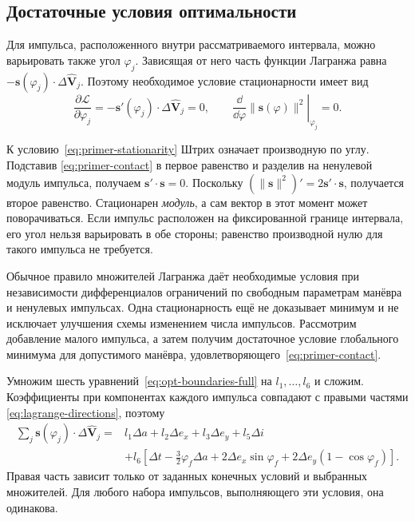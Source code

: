 \subsection{Достаточные условия оптимальности}
\label{sec:optimality-check-full}

Для импульса, расположенного внутри рассматриваемого интервала,
можно варьировать также угол $\varphi_j$. Зависящая от него часть
функции Лагранжа равна
$-\boldsymbol s(\varphi_j)\cdot\Delta\widehat{\boldsymbol V}_j$.
Поэтому необходимое условие стационарности имеет вид
\begin{equation}
 \frac{\partial\mathcal L}{\partial\varphi_j}
 =-\boldsymbol s'(\varphi_j)\cdot\Delta\widehat{\boldsymbol V}_j=0,
 \qquad
 \left.\frac{\dd}{\dd\varphi}\|\boldsymbol s(\varphi)\|^2
                  \right|_{\varphi_j}=0.
 \label{eq:primer-stationarity}
\end{equation}
\begin{explanation}{К условию~\eqref{eq:primer-stationarity}}
Штрих означает производную по углу. Подставив
\eqref{eq:primer-contact} в первое равенство и разделив
на ненулевой модуль импульса, получаем
$\boldsymbol s'\cdot\boldsymbol s=0$.
Поскольку $(\|\boldsymbol s\|^2)'=2\boldsymbol s'\cdot\boldsymbol s$,
получается второе равенство. Стационарен \emph{модуль},
а сам вектор в этот момент может поворачиваться.
Если импульс расположен на фиксированной границе интервала,
его угол нельзя варьировать в обе стороны; равенство производной
нулю для такого импульса не требуется.
\end{explanation}

Обычное правило множителей Лагранжа даёт необходимые условия
при независимости дифференциалов ограничений по свободным
параметрам манёвра и ненулевых импульсах.
Одна стационарность ещё не доказывает минимум и не исключает
улучшения схемы изменением числа импульсов.
Рассмотрим добавление малого импульса, а затем получим
достаточное условие глобального минимума для допустимого манёвра,
удовлетворяющего~\eqref{eq:primer-contact}.

Умножим шесть уравнений~\eqref{eq:opt-boundaries-full}
на $l_1,\ldots,l_6$ и сложим. Коэффициенты при компонентах
каждого импульса совпадают с правыми частями
\eqref{eq:lagrange-directions}, поэтому
\begin{equation}
\begin{aligned}
 \sum_j\boldsymbol s(\varphi_j)\cdot\Delta\widehat{\boldsymbol V}_j
   ={}&l_1\Delta a+l_2\Delta e_x+l_3\Delta e_y+l_5\Delta i\\
      &+l_6\left[\Delta t-\frac32\varphi_f\Delta a
          +2\Delta e_x\sin\varphi_f+2\Delta e_y(1-\cos\varphi_f)\right].
\end{aligned}
\label{eq:weighted-boundaries-full}
\end{equation}
Правая часть зависит только от заданных конечных условий
и выбранных множителей. Для любого набора импульсов,
выполняющего эти условия, она одинакова.

